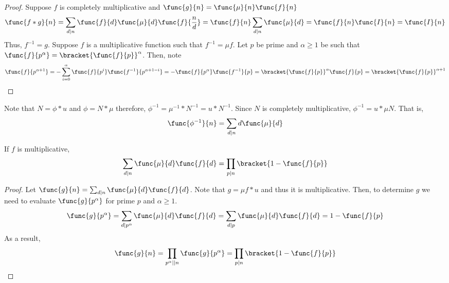 \begin{proof}
    Suppose \(f\) is completely multiplicative and \(\func{g}{n} = \func{\mu}{n} \func{f}{n}\)
    \begin{equation*}
        \func{f \ast g}{n} = \sum_{d \mid n} \func{f}{d} \func{\mu}{d} \func{f}{\frac{n}{d}} = \func{f}{n} \sum_{d \mid n} \func{\mu}{d} = \func{f}{n} \func{I}{n} = \func{I}{n}
    \end{equation*}
    Thus, \(f^{-1} = g\). Suppose \(f\) is a multiplicative function such that \(f^{-1} = \mu f\). Let \(p\) be prime and \(\alpha \geq 1\) be such that \(\func{f}{p^{\alpha}} = \bracket{\func{f}{p}}^{\alpha}\). Then, note 
    \begin{equation*}
        \func{f}{p^{\alpha + 1}} = -\sum_{i = 0}^{\alpha} \func{f}{p^i} \func{f^{-1}}{p^{\alpha + 1 - i}} =- \func{f}{p^{\alpha}} \func{f^{-1}}{p} =\bracket{\func{f}{p}}^{\alpha} \func{f}{p} = \bracket{\func{f}{p}}^{\alpha + 1}
    \end{equation*}
\end{proof}

\begin{remark}
    Note that \(N = \phi \ast u\) and \(\phi = N \ast \mu\) therefore, \(\phi^{-1}= \mu^{-1} \ast N^{-1} = u \ast N^{-1}\). Since \(N\) is completely multiplicative, \(\phi^{-1} = u \ast \mu N\). That is, 
    \begin{equation*}
        \func{\phi^{-1}}{n} = \sum_{d \mid n} d \func{\mu}{d}
    \end{equation*}
\end{remark}
\begin{theorem}
    If \(f\) is multiplicative,
    \begin{equation*}
        \sum_{d \mid n} \func{\mu}{d} \func{f}{d} = \prod_{p \mid n} \bracket{1 - \func{f}{p}}
    \end{equation*}
\end{theorem}

\begin{proof}
    Let \(\func{g}{n} = \sum_{d \mid n} \func{\mu}{d} \func{f}{d}\). Note that \(g = \mu f \ast u\) and thus it is multiplicative. Then, to determine \(g\) we need to evaluate \(\func{g}{p^{\alpha}}\) for prime \(p\) and \(\alpha \geq 1\).
    \begin{equation*}
        \func{g}{p^{\alpha}} = \sum_{d \mid p^{\alpha}} \func{\mu}{d} \func{f}{d} =
         \sum_{d \mid p} \func{\mu}{d} \func{f}{d} = 1 - \func{f}{p}
    \end{equation*}
    As a result, 
    \begin{equation*}
        \func{g}{n} = \prod_{p^{\alpha} \mid\mid n} \func{g}{p^{\alpha}} = \prod_{p \mid n} \bracket{1 - \func{f}{p}}
    \end{equation*}
\end{proof}


